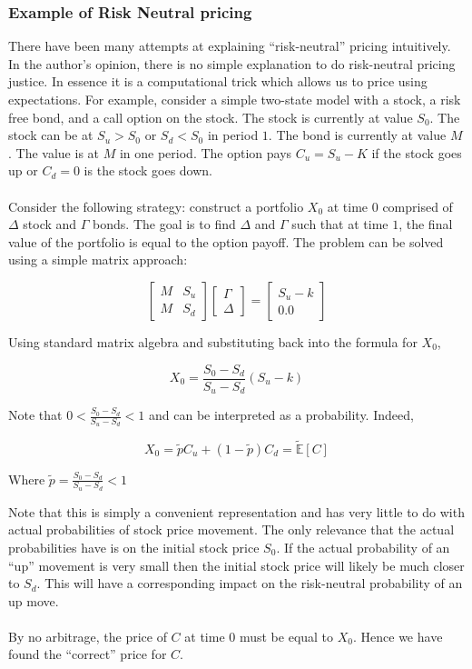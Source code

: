 \documentclass{article}
\theoremstyle{definition}
\begin{document}
\subsubsection{Example of Risk Neutral pricing} \label{RNExample}
There have been many attempts at explaining ``risk-neutral'' pricing intuitively.  In the author's opinion, there is no simple explanation to do risk-neutral pricing justice.  In essence it is a computational trick which allows us to price using expectations.  For example, consider a simple two-state model with a stock, a risk free bond, and a call option on the stock.  The stock is currently at value \(S_0\).  The stock can be at \(S_u>S_0\) or \(S_d<S_0\) in period \(1\).  The bond is currently at value \(M\).  The value is at \(M\) in one period.  The option pays \(C_u=S_u-K\) if the stock goes up or \(C_d=0\) is the stock goes down.  
\\
\\
Consider the following strategy: construct a portfolio \(X_0\) at time \(0\) comprised of \(\Delta\) stock and \(\Gamma\) bonds.  The goal is to find \(\Delta\) and \(\Gamma\) such that at time \(1\), the final value of the portfolio is equal to the option payoff.  The problem can be solved using a simple matrix approach:

\[
\begin{bmatrix}
	M & S_u \\
	M & S_d 
\end{bmatrix}
\begin{bmatrix}
\Gamma \\
\Delta 
\end{bmatrix}
=
\begin{bmatrix}
S_u-k \\
0.0
\end{bmatrix}
\]

Using standard matrix algebra and substituting back into the formula for \(X_0\), 

\[X_0=\frac{S_0-S_d}{S_u-S_d}\left(S_u-k\right)\]

Note that \(0<\frac{S_0-S_d}{S_u-S_d}<1\) and can be interpreted as a probability.  Indeed, 

\[X_0=\tilde{p}C_u+(1-\tilde{p})C_d =\mathbb{\tilde{E}}[C]\]

Where \(\tilde{p}=\frac{S_0-S_d}{S_u-S_d}<1\)

Note that this is simply a convenient representation and has very little to do with actual probabilities of stock price movement.  The only relevance that the actual probabilities have is on the initial stock price \(S_0\).  If the actual probability of an ``up'' movement is very small then the initial stock price will likely be much closer to \(S_d\).  This will have a corresponding impact on the risk-neutral probability of an up move.  
\\
\\
By no arbitrage, the price of \(C\) at time \(0\) must be equal to \(X_0\).  Hence we have found the ``correct'' price for \(C\).  
\end{document}
